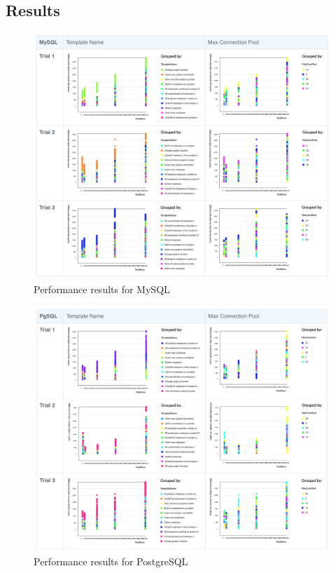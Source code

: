 \documentclass[12pt]{article}
\begin{document}
\begin{spacing}{1.9}
	\subsection{ Results}
	\begin{figure}[H]
		\centering
		\includegraphics[width=\textwidth]{MySQL.png}
		\caption{Performance results for MySQL }
		
	\end{figure}
	
	\begin{figure}[H]
		\centering
		\includegraphics[width=\textwidth]{PgSQL.png}
		\caption{Performance results for PostgreSQL  }
		

\end{figure}
\end{spacing}
\end{document}
